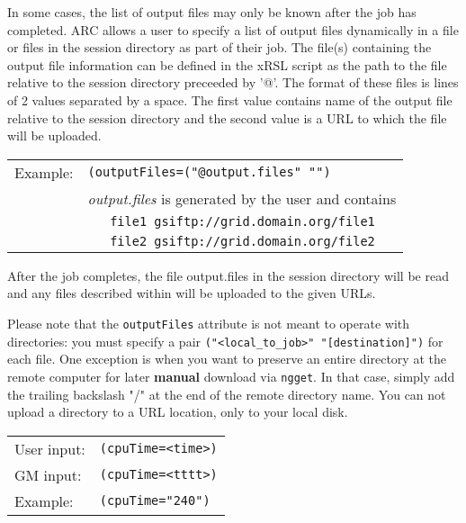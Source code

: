   In some cases, the list of output files may only be known after the
  job has completed. ARC allows a user to specify a list of output
  files dynamically in a file or files in the session directory as
  part of their job. The file(s) containing the output file
  information can be defined in the xRSL script as the path to the
  file relative to the session directory preceeded by '@'. The format
  of these files is lines of 2 values separated by a space. The first
  value contains name of the output file relative to the session
  directory and the second value is a URL to which the file will be
  uploaded.

  \begin{tabular}{lp{13cm}}
    Example:&\verb#(outputFiles=("@output.files" "")#\\
    & \emph{output.files} is generated by the user and contains \\
    &\verb#   file1 gsiftp://grid.domain.org/file1#\\
    &\verb#   file2 gsiftp://grid.domain.org/file2#\\
  \end{tabular}

  After the job completes, the file output.files in the session
  directory will be read and any files described within will be
  uploaded to the given URLs.

  \begin{framed}
    Please note that the \texttt{outputFiles} attribute is not meant to
    operate with directories: you must specify a pair
    \verb#("<local_to_job>" "[destination]")# for each file. One
    exception is when you want to preserve an entire directory at the
    remote computer for later \textbf{manual} download via
    \texttt{ngget}. In that case, simply add the trailing backslash
    "/" at the end of the remote directory name. You can not upload a
    directory to a URL location, only to your local disk.
  \end{framed}

  \hspace*{0.5cm}
  \begin{shaded}
  \end{shaded}
  \begin{tabular}{lp{13cm}}
    User input:&\verb#(cpuTime=<time>)#\\
    GM input:&\verb#(cpuTime=<tttt>)#\\
    Example:&\verb#(cpuTime="240")#\\
  \end{tabular}

